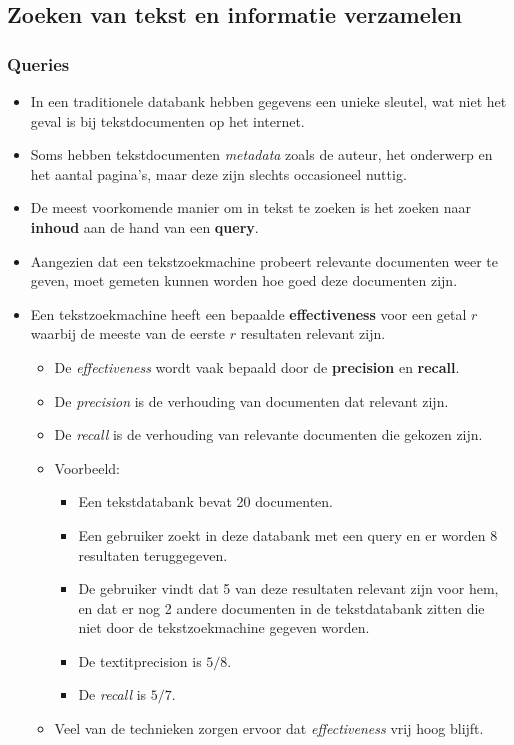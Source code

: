 \subsection{Zoeken van tekst en informatie verzamelen}
\subsubsection{Queries}
\begin{itemize}
    \item In een traditionele databank hebben gegevens een unieke sleutel, wat niet het geval is bij tekstdocumenten op het internet.
    \item Soms hebben tekstdocumenten \textit{metadata} zoals de auteur, het onderwerp en het aantal pagina's, maar deze zijn slechts occasioneel nuttig.
    \item De meest voorkomende manier om in tekst te zoeken is het zoeken naar \textbf{inhoud} aan de hand van een \textbf{query}.
    \item Aangezien dat een tekstzoekmachine probeert relevante documenten weer te geven, moet gemeten kunnen worden hoe goed deze documenten zijn.
    \item Een tekstzoekmachine heeft een bepaalde \textbf{effectiveness} voor een getal $r$ waarbij de meeste van de eerste $r$ resultaten relevant zijn. 
    \begin{itemize}
        \item De \textit{effectiveness} wordt vaak bepaald door de \textbf{precision} en \textbf{recall}.
        \item De \textit{precision} is de verhouding van documenten  dat relevant zijn.
        \item De \textit{recall} is de verhouding van relevante documenten die gekozen zijn.
        \item Voorbeeld:
        \begin{itemize}
            \item Een tekstdatabank bevat 20 documenten.
            \item Een gebruiker zoekt in deze databank met een query en er worden 8 resultaten teruggegeven.
            \item De gebruiker vindt dat 5 van deze resultaten relevant zijn voor hem, en dat er nog 2 andere documenten in de tekstdatabank zitten die niet door de tekstzoekmachine gegeven worden.
            \item De textit{precision} is $5/8$.
            \item De \textit{recall} is $5/7$.
        \end{itemize}
        \item Veel van de technieken zorgen ervoor dat \textit{effectiveness} vrij hoog blijft.
    \end{itemize}
\end{itemize}
